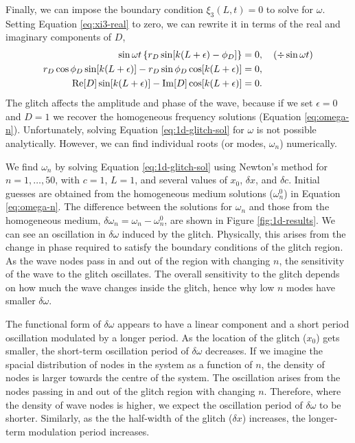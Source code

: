 Finally, we can impose the boundary condition \(\xi_3(L, t) = 0\) to solve for \(\omega\). Setting Equation \ref{eq:xi3-real} to zero, we can rewrite it in terms of the real and imaginary components of \(D\),
%
\begin{align}
    \sin \omega t \left\{r_D \sin[k(L + \epsilon) - \phi_D]\right\} &= 0, \quad (\div \sin \omega t) \notag \\
    r_D \cos \phi_D \sin[k(L + \epsilon)] - r_D \sin \phi_D \cos[k(L + \epsilon)] &= 0, \notag \\
    {\mathrm{Re}}[D] \sin[k(L + \epsilon)] - {\mathrm{Im}}[D] \cos[k(L + \epsilon)] &=0. \label{eq:1d-glitch-sol}
\end{align}
%
The glitch affects the amplitude and phase of the wave, because if we set \(\epsilon = 0\) and \(D = 1\) we recover the homogeneous frequency solutions (Equation \ref{eq:omega-n}). Unfortunately, solving Equation \ref{eq:1d-glitch-sol} for \(\omega\) is not possible analytically. However, we can find individual roots (or modes, \(\omega_n\)) numerically.

We find \(\omega_n\) by solving Equation \ref{eq:1d-glitch-sol} using Newton's method for \(n = 1,\dots,50\), with \(c=1\), \(L=1\), and several values of \(x_0\), \(\delta x\), and \(\delta c\). Initial guesses are obtained from the homogeneous medium solutions (\(\omega_n^0\)) in Equation \ref{eq:omega-n}. The difference between the solutions for \(\omega_n\) and those from the homogeneous medium, \(\delta \omega_n = \omega_n - \omega_n^0\), are shown in Figure \ref{fig:1d-results}. We can see an oscillation in \(\delta\omega\) induced by the glitch. Physically, this arises from the change in phase required to satisfy the boundary conditions of the glitch region. As the wave nodes pass in and out of the region with changing \(n\), the sensitivity of the wave to the glitch oscillates. The overall sensitivity to the glitch depends on how much the wave changes inside the glitch, hence why low \(n\) modes have smaller \(\delta\omega\).

The functional form of \(\delta\omega\) appears to have a linear component and a short period oscillation modulated by a longer period. As the location of the glitch (\(x_0\)) gets smaller, the short-term oscillation period of \(\delta\omega\) decreases. If we imagine the spacial distribution of nodes in the system as a function of \(n\), the density of nodes is larger towards the centre of the system. The oscillation arises from the nodes passing in and out of the glitch region with changing \(n\). Therefore, where the density of wave nodes is higher, we expect the oscillation period of \(\delta\omega\) to be shorter. Similarly, as the the half-width of the glitch (\(\delta x\)) increases, the longer-term modulation period increases. 

